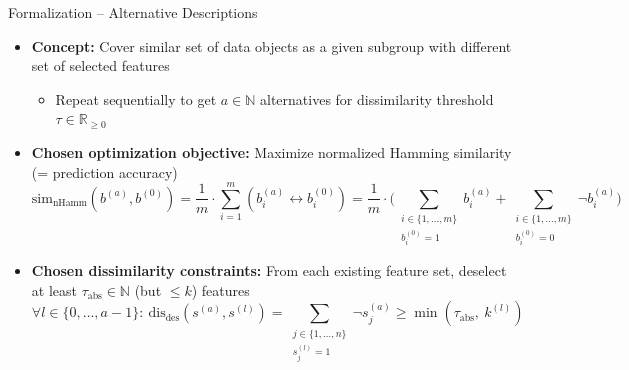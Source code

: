 \documentclass[en, navbaroff]{sdqbeamer}
\begin{document}
\begin{frame}[t]{Formalization -- Alternative Descriptions}
	\begin{itemize}
		\item \textbf{Concept:} Cover similar set of data objects as a given subgroup with different set of selected features
		\begin{itemize}
			\item Repeat sequentially to get $a \in \mathbb{N}$ alternatives for dissimilarity threshold~$\tau \in \mathbb{R}_{\geq 0}$
		\end{itemize}
		\pause
		\vspace{\baselineskip}
		\item \textbf{Chosen optimization objective:} Maximize normalized Hamming similarity (= prediction accuracy)
		\begin{equation*}
			\text{sim}_{\text{nHamm}}(b^{(a)}, b^{(0)}) = \frac{1}{m} \cdot \sum_{i=1}^m \left( b_i^{(a)} \leftrightarrow b_i^{(0)} \right) = \frac{1}{m} \cdot \Big( \sum\limits_{\substack{i \in \{1, \dots, m\} \\ b_i^{(0)} = 1}} b_i^{(a)} + \sum\limits_{\substack{i \in \{1, \dots, m\} \\ b_i^{(0)} = 0}} \lnot b_i^{(a)} \Big)
		\end{equation*}
		\pause
		\vspace{\baselineskip}
		\item \textbf{Chosen dissimilarity constraints:} From each existing feature set, deselect at least $\tau_{\text{abs}} \in \mathbb{N}$ (but $\leq k$) features
		\begin{equation*}
			\forall l \in \{0, \dots, a-1\}:~ \text{dis}_{\text{des}}(s^{(a)}, s^{(l)}) = \sum_{\substack{j \in \{1, \dots, n\} \\ s^{(l)}_j = 1}} \lnot s^{(a)}_j \geq \min \left( \tau_{\text{abs}},~k^{(l)} \right)
		\end{equation*}
	\end{itemize}
\end{frame}
\end{document}
